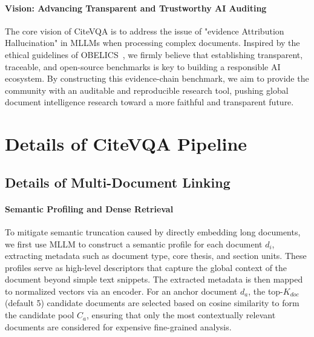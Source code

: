 \documentclass[]{opendatalab}
\begin{document}
{{{\paragraph{Vision: Advancing Transparent and Trustworthy AI Auditing} The core vision of CiteVQA is to address the issue of "evidence Attribution Hallucination" in MLLMs when processing complex documents. Inspired by the ethical guidelines of OBELICS~\citep{laurencon2023obelics}, we firmly believe that establishing transparent, traceable, and open-source benchmarks is key to building a responsible AI ecosystem. By constructing this evidence-chain benchmark, we aim to provide the community with an auditable and reproducible research tool, pushing global document intelligence research toward a more faithful and transparent future.


\newpage
\section{Details of CiteVQA Pipeline}
\label{Appendix: Details of CiteVQA Pipeline}

\subsection{Details of Multi-Document Linking}
\label{Appendix: Details of Multi-Document Linking}

\paragraph{Semantic Profiling and Dense Retrieval}
To mitigate semantic truncation caused by directly embedding long documents, we first use MLLM to construct a semantic profile for each document $d_i$, extracting metadata such as document type, core thesis, and section units. These profiles serve as high-level descriptors that capture the global context of the document beyond simple text snippets. The extracted metadata is then mapped to normalized vectors via an encoder. For an anchor document $d_a$, the top-$K_{doc}$ (default 5) candidate documents are selected based on cosine similarity to form the candidate pool $C_a$, ensuring that only the most contextually relevant documents are considered for expensive fine-grained analysis.

}}}
\end{document}
